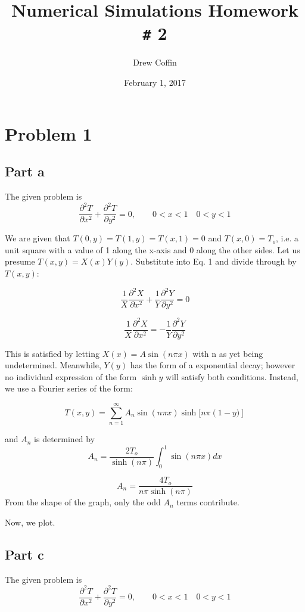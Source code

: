 \documentclass[11pt]{article} %
\title{Numerical Simulations Homework \texttt{\#} 2}
\author{Drew Coffin}
\date{February 1, 2017}
\begin{document}
\maketitle

\section{Problem 1}

\subsection{Part a}

The given problem is 
\begin{equation} \label{eq:1}
\frac{\partial^2 T}{\partial x^2} + \frac{\partial^2 T}{\partial y^2} = 0, \qquad 0 < x < 1 \quad 0 < y < 1 
\end{equation}

We are given that $T(0, y) = T(1, y) = T(x,1) = 0$ and $T(x,0) = T_o$, i.e. a unit square with a value of 1 along the x-axis and $0$ along the other sides. Let us presume $T(x, y) = X(x)Y(y)$. Substitute into Eq. 1 and divide through by $T(x,y)$:

\[   \frac{1}{X} \frac{\partial^2 X}{ \partial x^2} +  \frac{1}{Y} \frac{\partial^2 Y}{\partial y^2} = 0 \]

\[   \frac{1}{X} \frac{\partial^2 X}{ \partial x^2} = -  \frac{1}{Y} \frac{\partial^2 Y}{\partial y^2} \]

This is satisfied by letting $X(x) = A \sin(n \pi x)$ with n as yet being undetermined. Meanwhile, $Y(y)$ has the form of a exponential decay; however no individual expression of the form $\sinh{y}$  will satisfy both conditions. Instead, we use a Fourier series of the form:

\[ T(x, y) = \sum_{n=1}^{\infty} A_n \sin(n \pi x) \sinh[n \pi \left( 1 - y)\right] \]

and $A_n$ is determined by
\[ A_n = \frac{2 T_o}{ \sinh(n \pi)} \int_{0}^{1} \sin(n \pi x) dx\]

\[ A_n = \frac{4 T_o}{n \pi  \sinh(n \pi)}\]
From the shape of the graph, only the odd $A_n$ terms contribute.

Now, we plot.

\subsection{Part c}
The given problem is 
\begin{equation} \label{eq:2}
\frac{\partial^2 T}{\partial x^2} + \frac{\partial^2 T}{\partial y^2} = 0, \qquad 0 < x < 1 \quad 0 < y < 1 
\end{equation}
\end{document}
